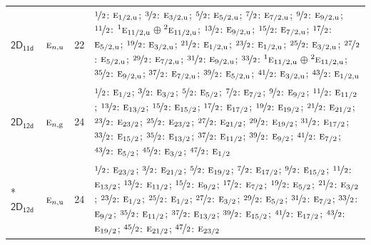 \documentclass[10pt,a4paper]{article}
\numberwithin{equation}{section}
\newcommand{\grp}[1]{\mathsf{#1}}
\newcommand{\irr}[1]{\text{\normalfont\scshape #1}}
\newcommand{\conjpair}[1]{{}^{#1}}
\newcommand{\ptag}[1]{\mathrm{#1}}
\newlength{\fillwidth}\newlength{\cellwidth}\newlength{\colwidth}
\begin{document}
{\begin{longtable}{@{}llr>{\RaggedRight\arraybackslash}p{\fillwidth}@{}}
\href{2D11d.pdf}{$\grp{2D_{11d}}$} & $\irr{e}_{n,\ptag{u}}$ & 22 & $\nicefrac{1}{2}$: $\irr{e}_{1/2,\ptag{u}}$; $\nicefrac{3}{2}$: $\irr{e}_{3/2,\ptag{u}}$; $\nicefrac{5}{2}$: $\irr{e}_{5/2,\ptag{u}}$; $\nicefrac{7}{2}$: $\irr{e}_{7/2,\ptag{u}}$; $\nicefrac{9}{2}$: $\irr{e}_{9/2,\ptag{u}}$; $\nicefrac{11}{2}$: $\conjpair{1}\irr{e}_{11/2,\ptag{u}}$${}\oplus{}$$\conjpair{2}\irr{e}_{11/2,\ptag{u}}$; $\nicefrac{13}{2}$: $\irr{e}_{9/2,\ptag{u}}$; $\nicefrac{15}{2}$: $\irr{e}_{7/2,\ptag{u}}$; $\nicefrac{17}{2}$: $\irr{e}_{5/2,\ptag{u}}$; $\nicefrac{19}{2}$: $\irr{e}_{3/2,\ptag{u}}$; $\nicefrac{21}{2}$: $\irr{e}_{1/2,\ptag{u}}$; $\nicefrac{23}{2}$: $\irr{e}_{1/2,\ptag{u}}$; $\nicefrac{25}{2}$: $\irr{e}_{3/2,\ptag{u}}$; $\nicefrac{27}{2}$: $\irr{e}_{5/2,\ptag{u}}$; $\nicefrac{29}{2}$: $\irr{e}_{7/2,\ptag{u}}$; $\nicefrac{31}{2}$: $\irr{e}_{9/2,\ptag{u}}$; $\nicefrac{33}{2}$: $\conjpair{1}\irr{e}_{11/2,\ptag{u}}$${}\oplus{}$$\conjpair{2}\irr{e}_{11/2,\ptag{u}}$; $\nicefrac{35}{2}$: $\irr{e}_{9/2,\ptag{u}}$; $\nicefrac{37}{2}$: $\irr{e}_{7/2,\ptag{u}}$; $\nicefrac{39}{2}$: $\irr{e}_{5/2,\ptag{u}}$; $\nicefrac{41}{2}$: $\irr{e}_{3/2,\ptag{u}}$; $\nicefrac{43}{2}$: $\irr{e}_{1/2,\ptag{u}}$\\
\href{2D12d.pdf}{$\grp{2D_{12d}}$} & $\irr{e}_{n,\ptag{g}}$ & 24 & $\nicefrac{1}{2}$: $\irr{e}_{1/2}$; $\nicefrac{3}{2}$: $\irr{e}_{3/2}$; $\nicefrac{5}{2}$: $\irr{e}_{5/2}$; $\nicefrac{7}{2}$: $\irr{e}_{7/2}$; $\nicefrac{9}{2}$: $\irr{e}_{9/2}$; $\nicefrac{11}{2}$: $\irr{e}_{11/2}$; $\nicefrac{13}{2}$: $\irr{e}_{13/2}$; $\nicefrac{15}{2}$: $\irr{e}_{15/2}$; $\nicefrac{17}{2}$: $\irr{e}_{17/2}$; $\nicefrac{19}{2}$: $\irr{e}_{19/2}$; $\nicefrac{21}{2}$: $\irr{e}_{21/2}$; $\nicefrac{23}{2}$: $\irr{e}_{23/2}$; $\nicefrac{25}{2}$: $\irr{e}_{23/2}$; $\nicefrac{27}{2}$: $\irr{e}_{21/2}$; $\nicefrac{29}{2}$: $\irr{e}_{19/2}$; $\nicefrac{31}{2}$: $\irr{e}_{17/2}$; $\nicefrac{33}{2}$: $\irr{e}_{15/2}$; $\nicefrac{35}{2}$: $\irr{e}_{13/2}$; $\nicefrac{37}{2}$: $\irr{e}_{11/2}$; $\nicefrac{39}{2}$: $\irr{e}_{9/2}$; $\nicefrac{41}{2}$: $\irr{e}_{7/2}$; $\nicefrac{43}{2}$: $\irr{e}_{5/2}$; $\nicefrac{45}{2}$: $\irr{e}_{3/2}$; $\nicefrac{47}{2}$: $\irr{e}_{1/2}$\\*
\href{2D12d.pdf}{$\grp{2D_{12d}}$} & $\irr{e}_{n,\ptag{u}}$ & 24 & $\nicefrac{1}{2}$: $\irr{e}_{23/2}$; $\nicefrac{3}{2}$: $\irr{e}_{21/2}$; $\nicefrac{5}{2}$: $\irr{e}_{19/2}$; $\nicefrac{7}{2}$: $\irr{e}_{17/2}$; $\nicefrac{9}{2}$: $\irr{e}_{15/2}$; $\nicefrac{11}{2}$: $\irr{e}_{13/2}$; $\nicefrac{13}{2}$: $\irr{e}_{11/2}$; $\nicefrac{15}{2}$: $\irr{e}_{9/2}$; $\nicefrac{17}{2}$: $\irr{e}_{7/2}$; $\nicefrac{19}{2}$: $\irr{e}_{5/2}$; $\nicefrac{21}{2}$: $\irr{e}_{3/2}$; $\nicefrac{23}{2}$: $\irr{e}_{1/2}$; $\nicefrac{25}{2}$: $\irr{e}_{1/2}$; $\nicefrac{27}{2}$: $\irr{e}_{3/2}$; $\nicefrac{29}{2}$: $\irr{e}_{5/2}$; $\nicefrac{31}{2}$: $\irr{e}_{7/2}$; $\nicefrac{33}{2}$: $\irr{e}_{9/2}$; $\nicefrac{35}{2}$: $\irr{e}_{11/2}$; $\nicefrac{37}{2}$: $\irr{e}_{13/2}$; $\nicefrac{39}{2}$: $\irr{e}_{15/2}$; $\nicefrac{41}{2}$: $\irr{e}_{17/2}$; $\nicefrac{43}{2}$: $\irr{e}_{19/2}$; $\nicefrac{45}{2}$: $\irr{e}_{21/2}$; $\nicefrac{47}{2}$: $\irr{e}_{23/2}$\\

\end{longtable}}
\end{document}
